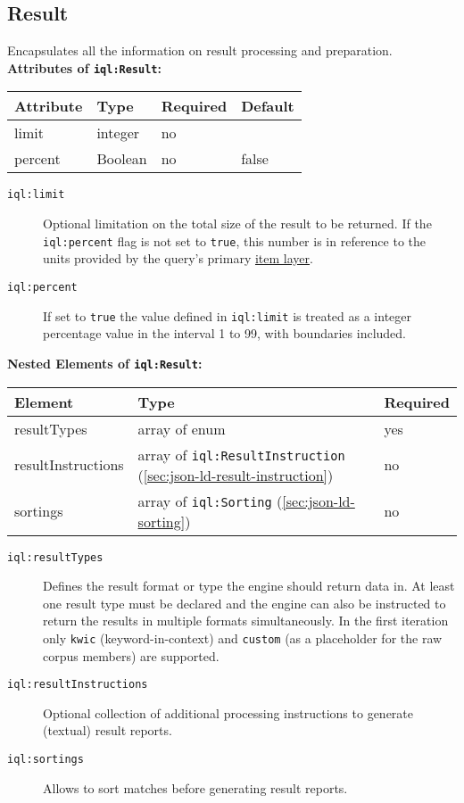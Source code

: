 \documentclass[11pt]{article}
\newcommand{\iqlns}{iql:}
\newcommand{\repoUrl}{https://github.com/ICARUS-tooling/icarus2-modeling-framework/blob/dev/}
\newcommand{\modelsUrl}{\repoUrl icarus2-model-api/src/main/java/de/ims/icarus2/model/api/}
\newcommand{\repoLink}[2]{\href{#1}{#2}}
\newcommand{\iqlType}[1]{\texttt{\iqlns#1}}
\newcommand{\desc}[1]{\noindent#1\newline\medskip}
\newenvironment{attributes}[1]{
\noindent\textbf{Attributes of #1:}\newline\medskip
\begin{tabular}{|p{0.3\textwidth}|p{0.20\textwidth}|p{0.20\textwidth}|p{0.17\textwidth}|}
	\hline
	\textbf{Attribute} & \textbf{Type} & \textbf{Required} & \textbf{Default} \\ 
	\hline
	\hline
}{
\end{tabular}
}
\newcommand{\attribute}[4]{
	#1 & #2 & #3 & #4 \\
	\hline
}
\newenvironment{elements}[1]{
\noindent\textbf{Nested Elements of #1:}\newline\medskip
\begin{tabular}{|p{0.3\textwidth}|p{0.42\textwidth}|p{0.17\textwidth}|}
	\hline
	\textbf{Element} & \textbf{Type} & \textbf{Required} \\ 
	\hline
	\hline
}{
\end{tabular}
}
\newcommand{\element}[3]{
#1 & #2 & #3 \\
\hline
}
\begin{document}
\subsection{Result}
\label{sec:json-ld-result}
\desc{Encapsulates all the information on result processing and preparation.}
\begin{attributes}{\iqlType{Result}}
	\attribute{limit}{integer}{no}{}
	\attribute{percent}{Boolean}{no}{false}
\end{attributes}
\begin{description}
	\item[\iqlType{limit}] Optional limitation on the total size of the result to be returned. If the \iqlType{percent} flag is not set to \texttt{true}, this number is in reference to the units provided by the query's primary \repoLink{\modelsUrl layer/ItemLayer.java}{item layer}.
	\item[\iqlType{percent}] If set to \texttt{true} the value defined in \iqlType{limit} is treated as a integer percentage value in the interval 1 to 99, with boundaries included.
\end{description}
\begin{elements}{\iqlType{Result}}
	\element{resultTypes}{array of enum}{yes}
	\element{resultInstructions}{array of \iqlType{ResultInstruction} (\ref{sec:json-ld-result-instruction})}{no}
	\element{sortings}{array of \iqlType{Sorting} (\ref{sec:json-ld-sorting})}{no}
\end{elements}
\begin{description}
	\item[\iqlType{resultTypes}] Defines the result format or type the engine should return data in. At least one result type must be declared and the engine can also be instructed to return the results in multiple formats simultaneously. In the first iteration only \texttt{kwic} (keyword-in-context) and \texttt{custom} (as a placeholder for the raw corpus members) are supported.
	\item[\iqlType{resultInstructions}] Optional collection of additional processing instructions to generate (textual) result reports.
	\item[\iqlType{sortings}] Allows to sort matches before generating result reports.
\end{description}
\end{document}
